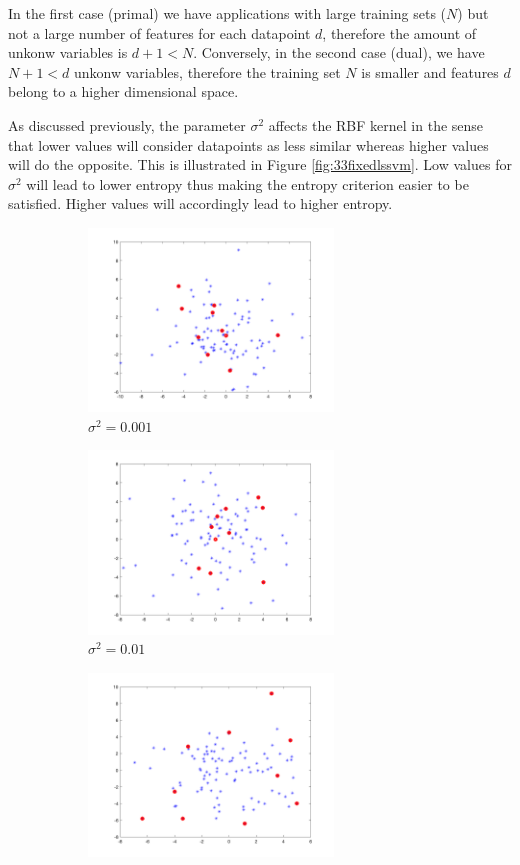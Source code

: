\documentclass[a4paper, 11pt, one column]{article}
\begin{document}
In the first case (primal) we have applications with large training sets ($N$) but not a large number of features for each datapoint $d$, therefore the amount of unkonw variables is $d+1 < N$. Conversely, in the second case (dual), we have $N+1<d$ unkonw variables, therefore the training set $N$ is smaller and features $d$ belong to a higher dimensional space. 

As discussed previously, the parameter $\sigma^2$ affects the RBF kernel in the sense that lower values will consider datapoints as less similar whereas higher values will do the opposite. This is illustrated in Figure \ref{fig:33fixedlssvm}. Low values for $\sigma^2$ will lead to lower entropy thus making the entropy criterion easier to be satisfied. Higher values will accordingly lead to higher entropy. 

\begin{figure}[H]
    \centering
        \begin{subfigure}{0.33\textwidth}
            \includegraphics[width=6.5cm]{images/fixed3.3_sigma_0.001.png}
            \caption{$\sigma^2 = 0.001$}
        \end{subfigure}\hfil
        \begin{subfigure}{0.33\textwidth}
            \includegraphics[width=6.5cm]{images/fixed3.3_sigma_0.01.png}
            \caption{$\sigma^2 = 0.01$}
        \end{subfigure}\hfil
        \begin{subfigure}{0.33\textwidth}
            \includegraphics[width=6.5cm]{images/fixed3.3_sigma_0.1.png}

\end{subfigure}
\end{figure}
\end{document}
